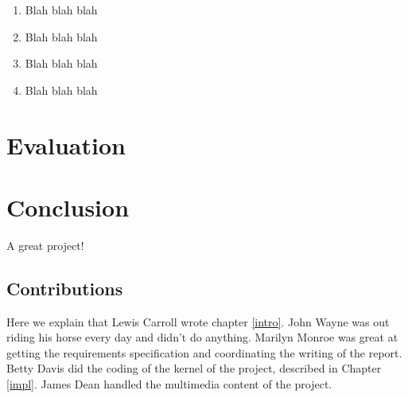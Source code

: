 \documentclass{l3proj}
\begin{document}
\begin{enumerate}
\item Blah blah blah
\item Blah blah blah
\item Blah blah blah
\item Blah blah blah
\end{enumerate}



\chapter{Evaluation}
\chapter{Conclusion}

A great project!

\section{Contributions}

Here we explain that Lewis Carroll wrote chapter \ref{intro}. John Wayne
was out riding his horse every day and didn't do anything. Marilyn Monroe
was great at getting the requirements specification and coordinating the
writing of the report. Betty Davis did the coding of the kernel of the
project, described in Chapter \ref{impl}.  James Dean handled the
multimedia content of the project.



\end{document}
